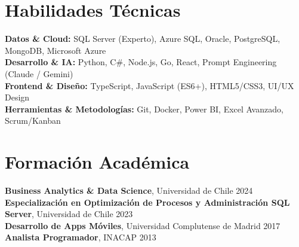 \documentclass[11pt,letterpaper]{article}
\begin{document}
\section{Habilidades T\'{e}cnicas}
\textbf{Datos \& Cloud:} SQL Server (Experto), Azure SQL, Oracle, PostgreSQL, MongoDB, Microsoft Azure \\
\textbf{Desarrollo \& IA:} Python, C\#, Node.js, Go, React, Prompt Engineering (Claude / Gemini) \\
\textbf{Frontend \& Diseño:} TypeScript, JavaScript (ES6+), HTML5/CSS3, UI/UX Design \\
\textbf{Herramientas \& Metodologías:} Git, Docker, Power BI, Excel Avanzado, Scrum/Kanban

\section{Formaci\'{o}n Acad\'{e}mica}
\textbf{Business Analytics \& Data Science}, Universidad de Chile \hfill 2024 \\
\textbf{Especialización en Optimización de Procesos y Administración SQL Server}, Universidad de Chile \hfill 2023 \\
\textbf{Desarrollo de Apps Móviles}, Universidad Complutense de Madrid \hfill 2017 \\
\textbf{Analista Programador}, INACAP \hfill 2013
\end{document}
